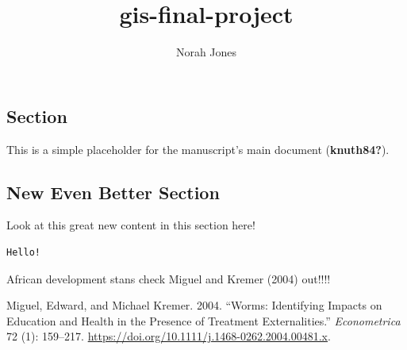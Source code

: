 \documentclass[
  letterpaper,
  DIV=11,
  numbers=noendperiod]{scrartcl}
\title{gis-final-project}
\author{Norah Jones}
\date{}
\newlength{\cslhangindent}
\newenvironment{CSLReferences}[2] %
 {\begin{list}{}{%
  \setlength{\itemindent}{0pt}
  \setlength{\leftmargin}{0pt}
  \setlength{\parsep}{0pt}
  \ifodd #1
   \setlength{\leftmargin}{\cslhangindent}
   \setlength{\itemindent}{-1\cslhangindent}
  \fi
  \setlength{\itemsep}{#2\baselineskip}}}
 {\end{list}}
\begin{document}
\maketitle


\subsection{Section}\label{section}

This is a simple placeholder for the manuscript's main document
(\textbf{knuth84?}).

\subsection{New Even Better Section}\label{new-even-better-section}

Look at this great new content in this section here!

\begin{verbatim}
Hello!
\end{verbatim}

African development stans check Miguel and Kremer (2004) out!!!!

\protect{}\label{refs}
\begin{CSLReferences}{1}{1}
Miguel, Edward, and Michael Kremer. 2004. {``Worms: {Identifying
Impacts} on {Education} and {Health} in the {Presence} of {Treatment
Externalities}.''} \emph{Econometrica} 72 (1): 159--217.
\url{https://doi.org/10.1111/j.1468-0262.2004.00481.x}.

\end{CSLReferences}
\end{document}
